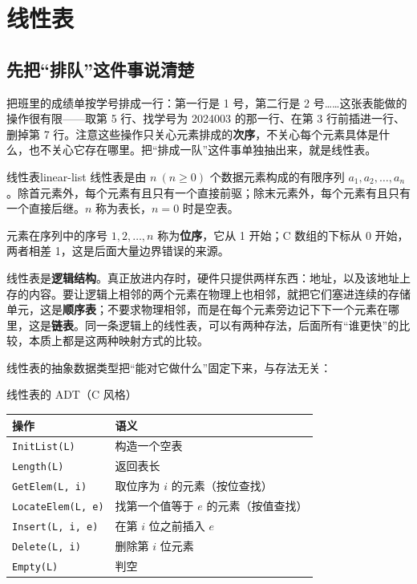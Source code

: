 \section{线性表}

\subsection{先把“排队”这件事说清楚}

把班里的成绩单按学号排成一行：第一行是 1 号，第二行是 2 号……这张表能做的操作很有限——取第 5 行、找学号为 2024003 的那一行、在第 3 行前插进一行、删掉第 7 行。注意这些操作只关心元素排成的\textbf{次序}，不关心每个元素具体是什么，也不关心它存在哪里。把“排成一队”这件事单独抽出来，就是线性表。

\begin{mydef}{线性表}{linear-list}
线性表是由 $n\ (n\geqslant 0)$ 个数据元素构成的有限序列 $a_1,a_2,\ldots,a_n$。除首元素外，每个元素有且只有一个直接前驱；除末元素外，每个元素有且只有一个直接后继。$n$ 称为表长，$n=0$ 时是空表。

元素在序列中的序号 $1,2,\ldots,n$ 称为\textbf{位序}，它从 1 开始；C 数组的下标从 0 开始，两者相差 1，这是后面大量边界错误的来源。
\end{mydef}

线性表是\textbf{逻辑结构}。真正放进内存时，硬件只提供两样东西：地址，以及该地址上存的内容。要让逻辑上相邻的两个元素在物理上也相邻，就把它们塞进连续的存储单元，这是\textbf{顺序表}；不要求物理相邻，而是在每个元素旁边记下下一个元素在哪里，这是\textbf{链表}。同一条逻辑上的线性表，可以有两种存法，后面所有“谁更快”的比较，本质上都是这两种映射方式的比较。

线性表的抽象数据类型把“能对它做什么”固定下来，与存法无关：

\begin{tablebox}{线性表的 ADT（C 风格）}
\centering
\begin{tabular}{l|l}
\toprule
操作 & 语义 \\
\midrule
\texttt{InitList(L)} & 构造一个空表 \\
\texttt{Length(L)} & 返回表长 \\
\texttt{GetElem(L, i)} & 取位序为 $i$ 的元素（按位查找） \\
\texttt{LocateElem(L, e)} & 找第一个值等于 $e$ 的元素（按值查找） \\
\texttt{Insert(L, i, e)} & 在第 $i$ 位之前插入 $e$ \\
\texttt{Delete(L, i)} & 删除第 $i$ 位元素 \\
\texttt{Empty(L)} & 判空 \\
\bottomrule
\end{tabular}
\end{tablebox}


